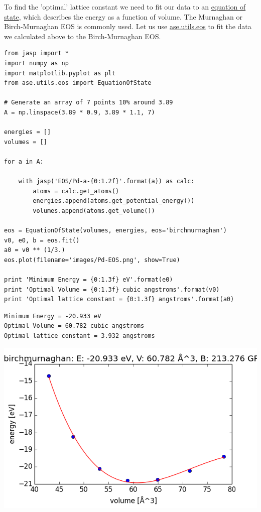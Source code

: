 \documentclass[11pt]{article}
\begin{document}
To find the 'optimal' lattice constant we need to fit our data to an \href{http://gilgamesh.cheme.cmu.edu/doc/software/jacapo/appendices/appendix-eos.html}{equation of state}, which describes the energy as a function of volume. The Murnaghan or Birch-Murnaghan EOS is commonly used. Let us use \href{ase.utils.eos}{ase.utils.eos} to fit the data we calculated above to the Birch-Murnaghan EOS.

\begin{verbatim}
from jasp import *
import numpy as np
import matplotlib.pyplot as plt
from ase.utils.eos import EquationOfState

# Generate an array of 7 points 10% around 3.89
A = np.linspace(3.89 * 0.9, 3.89 * 1.1, 7) 

energies = []
volumes = []

for a in A:

    with jasp('EOS/Pd-a-{0:1.2f}'.format(a)) as calc:
        atoms = calc.get_atoms()
        energies.append(atoms.get_potential_energy())
        volumes.append(atoms.get_volume())

eos = EquationOfState(volumes, energies, eos='birchmurnaghan')
v0, e0, b = eos.fit()
a0 = v0 ** (1/3.)
eos.plot(filename='images/Pd-EOS.png', show=True)

print 'Minimum Energy = {0:1.3f} eV'.format(e0)
print 'Optimal Volume = {0:1.3f} cubic angstroms'.format(v0)
print 'Optimal lattice constant = {0:1.3f} angstroms'.format(a0)
\end{verbatim}

\begin{verbatim}
Minimum Energy = -20.933 eV
Optimal Volume = 60.782 cubic angstroms
Optimal lattice constant = 3.932 angstroms
\end{verbatim}

\includegraphics[width=.9\linewidth]{./images/Pd-EOS.png}
\end{document}
